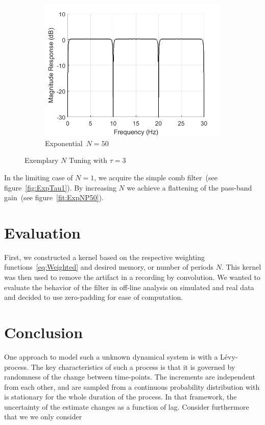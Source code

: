 \documentclass[a4paper]{article}
\newcommand{\figref}[1]{(see figure~\ref{#1})}
\begin{document}
\begin{figure}[hbtp]
\begin{subfigure}{.33\textwidth}
        \includegraphics[width=\textwidth]{img/np/mag_exp_50.png}
        \caption{Exponential~$N=50$}\label{fig:ExpNP50}
    \end{subfigure}
    \caption{Exemplary $N$ Tuning with $\tau = 3$}\label{fig:ExemplaryNPTuning}
\end{figure}

In the limiting case of $N = 1$, we acquire the simple comb filter~\figref{fig:ExpTau1}. By increasing $N$ we achieve a flattening of the pass-band gain~\figref{fit:ExpNP50}.

\section{Evaluation}


First, we constructed a kernel based on the respective weighting functions~\eqref{eq:Weighted} and desired memory, or number of periods $N$. This kernel was then used to remove the artifact in a recording by convolution.
We wanted to evaluate the behavior of the filter in off-line analysis on simulated and real data and decided to use zero-padding for ease of computation.


\section{Conclusion}

One approach to model such a unknown dynamical system is with a Lévy-process. The key characteristics of such a process is that it is governed by randomness of the change between time-points. The increments are independent from each other, and are sampled from a continuous probability distribution with is stationary for the whole duration of the process. In that framework, the uncertainty of the estimate changes as a function of lag. Consider furthermore that we we only consider
\end{document}

